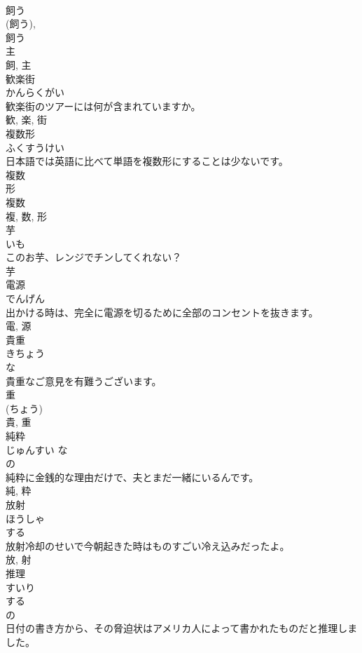 \documentclass[8pt]{extreport}
\begin{document}
\begin{CJK}{UTF8}{min}
\\	飼う 
\\	(飼う), 
\\	飼う 
\\	主 
\\	飼, 主	
\\	歓楽街	
\\	かんらくがい	
\\	歓楽街のツアーには何が含まれていますか。	
\\	歓, 楽, 街	
\\	複数形	
\\	ふくすうけい	
\\	日本語では英語に比べて単語を複数形にすることは少ないです。	
\\	複数 
\\	形 
\\	複数 
\\	複, 数, 形	
\\	芋	
\\	いも	
\\	このお芋、レンジでチンしてくれない？	
\\	芋	
\\	電源	
\\	でんげん	
\\	出かける時は、完全に電源を切るために全部のコンセントを抜きます。	
\\	電, 源	
\\	貴重	
\\	きちょう	
\\	な 
\\	貴重なご意見を有難うございます。	
\\	重 
\\	(ちょう) 
\\	貴, 重	
\\	純粋	
\\	じゅんすい	な 
\\	の 
\\	純粋に金銭的な理由だけで、夫とまだ一緒にいるんです。	
\\	純, 粋	
\\	放射	
\\	ほうしゃ	
\\	する 
\\	放射冷却のせいで今朝起きた時はものすごい冷え込みだったよ。	
\\	放, 射	
\\	推理	
\\	すいり	
\\	する 
\\	の 
\\	日付の書き方から、その脅迫状はアメリカ人によって書かれたものだと推理しました。	

\end{CJK}
\end{document}
